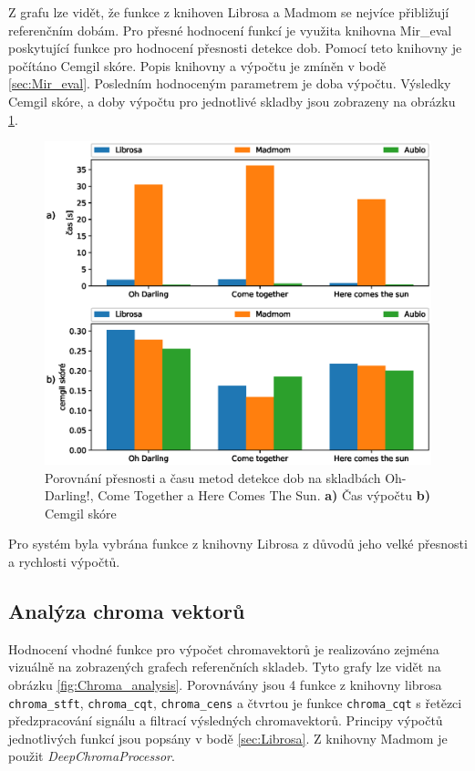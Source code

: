 Z grafu lze vidět, že funkce z knihoven Librosa a Madmom se nejvíce přibližují referenčním dobám. Pro přesné hodnocení funkcí je využita knihovna Mir\_eval poskytující funkce pro hodnocení přesnosti detekce dob. Pomocí teto knihovny je počítáno Cemgil skóre. Popis knihovny a výpočtu je zmíněn v bodě \ref{sec:Mir_eval}. Posledním hodnoceným parametrem je doba výpočtu. Výsledky Cemgil skóre, a doby výpočtu pro jednotlivé skladby jsou zobrazeny na obrázku \ref{fig:Beat_tracking_time_and_cemgil}.

\begin{figure}[H]
    \centering
    \includegraphics[width = 1\linewidth]{obrazky/Beat_tracking_time_and_cemgil_graphs.eps}
    \caption{Porovnání přesnosti a času metod detekce dob na skladbách Oh-Darling!, Come Together a Here Comes The Sun. \textbf{a)} Čas výpočtu \textbf{b)} Cemgil skóre}
    \label{fig:Beat_tracking_time_and_cemgil}
\end{figure}

Pro systém byla vybrána funkce z knihovny Librosa z důvodů jeho velké přesnosti a rychlosti výpočtů.

\subsection{Analýza chroma vektorů}

Hodnocení vhodné funkce pro výpočet chromavektorů je realizováno zejména vizuálně na zobrazených grafech referenčních skladeb. Tyto grafy lze vidět na obrázku \ref{fig:Chroma_analysis}. Porovnávány jsou 4 funkce z knihovny librosa \texttt{chroma\_stft}, \texttt{chroma\_cqt}, \texttt{chroma\_cens} a čtvrtou je funkce \texttt{chroma\_cqt} s řetězci předzpracování signálu a filtrací výsledných chromavektorů. Principy výpočtů jednotlivých funkcí jsou popsány v bodě \ref{sec:Librosa}. Z knihovny Madmom je použit \textit{DeepChromaProcessor}.

